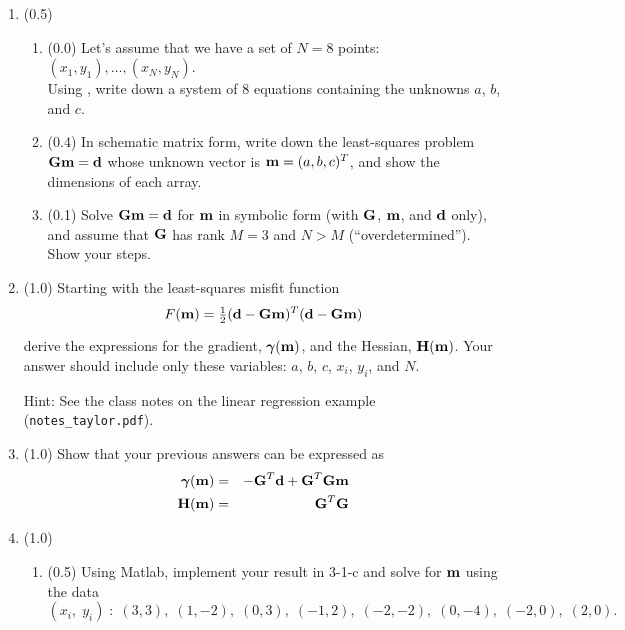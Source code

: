 \documentclass[11pt,titlepage,fleqn]{article}
\begin{document}
\begin{enumerate}
\item (0.5) 

\begin{enumerate}
\item (0.0) Let's assume that we have a set of $N=8$ points: $(x_1,y_1), \ldots, (x_N,y_N)$. \\
Using , write down a system of 8 equations containing the unknowns $a$, $b$, and $c$.

\item  (0.4) In schematic matrix form, write down the least-squares problem $\mbox{${\bf G}$}\mbox{${\bf m}$}=\mbox{${\bf d}$}$ whose unknown vector is $\mbox{${\bf m}$} = (a,b,c)^T$, and show the dimensions of each array.

\item (0.1) Solve $\mbox{${\bf G}$}\mbox{${\bf m}$}=\mbox{${\bf d}$}$ for $\mbox{${\bf m}$}$ in symbolic form (\ie with $\mbox{${\bf G}$}$, $\mbox{${\bf m}$}$, and $\mbox{${\bf d}$}$ only), and assume that $\mbox{${\bf G}$}$ has rank $M = 3$ and $N > M$ (``overdetermined''). Show your steps.
\end{enumerate}


\item (1.0) Starting with the least-squares misfit function
%
\begin{equation}
F(\bem) = \hlf (\bd - \bG\bem)^T(\bd - \bG\bem)
\end{equation}
%
derive the expressions for the gradient, $\mbox{\boldmath $\bf \gamma$}(\mbox{${\bf m}$})$, and the Hessian, $\mbox{${\bf H}$}(\mbox{${\bf m}$})$. Your answer should include only these variables: $a$, $b$, $c$, $x_i$, $y_i$, and $N$.

Hint: See the class notes on the linear regression example (\verb+notes_taylor.pdf+).


\item (1.0) Show that your previous answers can be expressed as
%
\begin{eqnarray}
\mbox{\boldmath $\bf \gamma$}(\mbox{${\bf m}$}) &=& -\mbox{${\bf G}$}^T\mbox{${\bf d}$} + \mbox{${\bf G}$}^T\mbox{${\bf G}$}\mbox{${\bf m}$}
\\
\mbox{${\bf H}$}(\mbox{${\bf m}$}) &=& \mbox{${\bf G}$}^T\mbox{${\bf G}$}
\end{eqnarray}


\item (1.0)
\begin{enumerate}
\item (0.5) Using Matlab, implement your result in 3-1-c and solve for $\mbox{${\bf m}$}$ using the data
%
\begin{equation*}
(x_i,\;y_i) \;:\; (3,3),\;(1,-2),\;(0,3),\;(-1,2),\;(-2,-2),\;(0,-4),\;(-2,0),\;(2,0).
\end{equation*}


\end{enumerate}
\end{enumerate}
\end{document}
